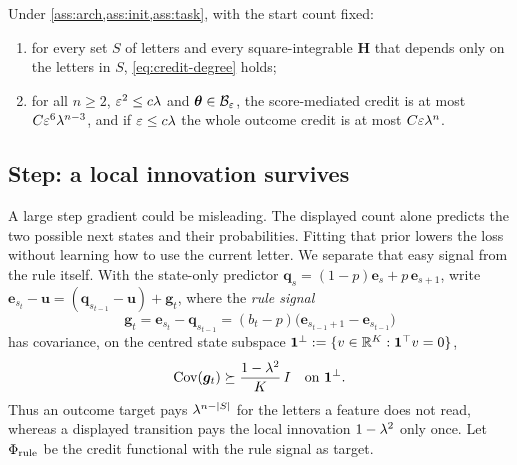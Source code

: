 \begin{theorem}
\label{thm:main}
Under \cref{ass:arch,ass:init,ass:task}, with the start count fixed:
\begin{enumerate}[label=(\roman*),leftmargin=*,itemsep=0pt,topsep=2pt]
\item for every set $S$ of letters and every square-integrable $\mathbf H$ that depends only on the letters in $S$, \cref{eq:credit-degree} holds;
\item for all $n\ge2$, $\varepsilon^2\le c\lambda$ and $\bm\theta\in\mathcal B_{\varepsilon}$, the score-mediated credit is at most $C\varepsilon^6\lambda^{n-3}$, and if
$\varepsilon\le c\lambda$ the whole outcome credit is at most $C\varepsilon\lambda^n$.
\end{enumerate}
\end{theorem}

\subsection{Step: a local innovation survives}
A large step gradient could be misleading. The displayed count alone predicts the two possible next states and their probabilities.
Fitting that prior lowers the loss without learning how to use the current letter. We separate that easy signal from the rule itself. With the
state-only predictor $\bm q_s=(1-p)\bm e_s+p\,\bm e_{s+1}$, write $\bm e_{s_t}-\bm u=(\bm q_{s_{t-1}}-\bm u)+\bm g_t$, where the
\emph{rule signal}
\[
 \bm g_t=\bm e_{s_t}-\bm q_{s_{t-1}}=(b_t-p)\bigl(\bm e_{s_{t-1}+1}-\bm e_{s_{t-1}}\bigr)
\]
has covariance, on the centred state subspace $\mathbf 1^\perp:=\{v\in\mathbb R^K:\mathbf 1^\top v=0\}$,
\begin{equation}
 \operatorname{Cov}(\bm g_t)\succeq\frac{1-\lambda^2}{K}\,I
 \quad\text{on }\mathbf 1^\perp.
 \label{eq:local-variation}
\end{equation}
Thus an outcome target pays $\lambda^{n-|S|}$ for the letters a feature does not read, whereas a displayed transition pays the
local innovation $1-\lambda^2$ only once. Let $\Phi_{\mathrm{rule}}$ be the credit
functional with the rule signal as target.

